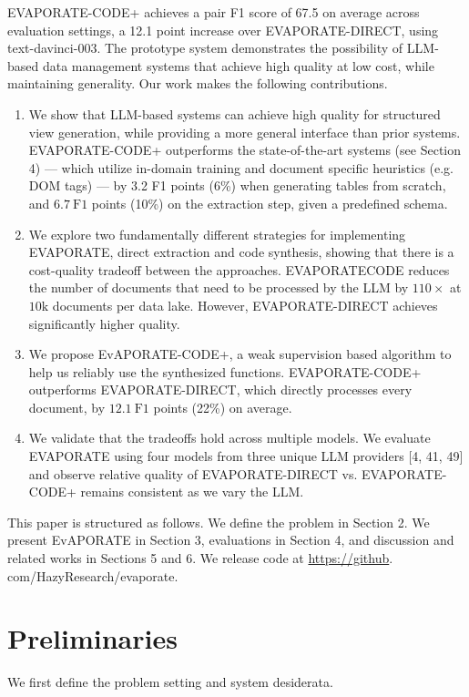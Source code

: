 \documentclass[10pt]{article}
\begin{document}
EVAPORATE-CODE+ achieves a pair F1 score of 67.5 on average across evaluation settings, a 12.1 point increase over EVAPORATE-DIRECT, using text-davinci-003. The prototype system demonstrates the possibility of LLM-based data management systems that achieve high quality at low cost, while maintaining generality. Our work makes the following contributions.

\begin{enumerate}
  \item We show that LLM-based systems can achieve high quality for structured view generation, while providing a more general interface than prior systems. EVAPORATE-CODE+ outperforms the state-of-the-art systems (see Section 4) — which utilize in-domain training and document specific heuristics (e.g. DOM tags) — by 3.2 F1 points (6\%) when generating tables from scratch, and $6.7 \mathrm{~F} 1$ points (10\%) on the extraction step, given a predefined schema.

  \item We explore two fundamentally different strategies for implementing EVAPORATE, direct extraction and code synthesis, showing that there is a cost-quality tradeoff between the approaches. EVAPORATECODE reduces the number of documents that need to be processed by the LLM by $110 \times$ at $10 \mathrm{k}$ documents per data lake. However, EVAPORATE-DIRECT achieves significantly higher quality.

  \item We propose EvAPORATE-CODE+, a weak supervision based algorithm to help us reliably use the synthesized functions. EVAPORATE-CODE+ outperforms EVAPORATE-DIRECT, which directly processes every document, by $12.1 \mathrm{~F} 1$ points (22\%) on average.

  \item We validate that the tradeoffs hold across multiple models. We evaluate EVAPORATE using four models from three unique LLM providers [4, 41, 49] and observe relative quality of EVAPORATE-DIRECT vs. EVAPORATE-CODE+ remains consistent as we vary the LLM.

\end{enumerate}

This paper is structured as follows. We define the problem in Section 2. We present EvAPORATE in Section 3, evaluations in Section 4, and discussion and related works in Sections 5 and 6. We release code at \href{https://github}{https://github}. com/HazyResearch/evaporate.

\section{Preliminaries}
We first define the problem setting and system desiderata.
\end{document}
